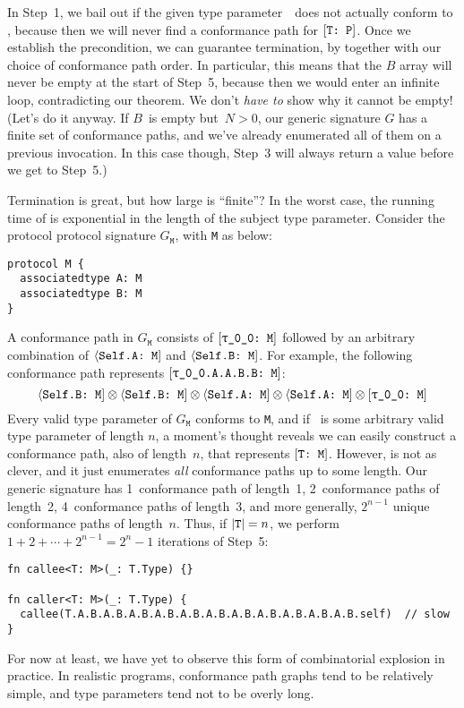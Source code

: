 \documentclass[../generics]{subfiles}
\begin{document}
In Step~1, we bail out if the given type parameter~\tT\ does not actually conform to \tP, because then we will never find a conformance path for $[\texttt{T:~P}]$. Once we establish the precondition, we can guarantee termination, by  together with our choice of conformance path order. In particular, this means that the $B$ array will never be empty at the start of Step~5, because then we would enter an infinite loop, contradicting our theorem. We don't \emph{have to} show why it cannot be empty! (Let's do it anyway. If $B$~is empty but~$N>0$, our generic signature $G$ has a finite set of conformance paths, and we've already enumerated all of them on a previous invocation. In this case though, Step~3 will always return a value before we get to Step~5.)

\begin{example}\label{free monoid first time}
Termination is great, but how large is ``finite''? In the worst case, the running time of  is exponential in the length of the subject type parameter. Consider the protocol protocol signature $G_\texttt{M}$, with \texttt{M} as below:
\begin{Verbatim}
protocol M {
  associatedtype A: M
  associatedtype B: M
}
\end{Verbatim}
A conformance path in $G_{\texttt{M}}$ consists of $\ConfReq{\rT}{M}$ followed by an arbitrary combination of $\langle\texttt{Self.A:~M}]$ and $\langle\texttt{Self.B:~M}]$. For example, the following conformance path represents $\ConfReq{\rT.A.A.B.B}{M}$:
\[
\AssocConf{Self.B}{M} \otimes \AssocConf{Self.B}{M} \otimes \AssocConf{Self.A}{M} \otimes \AssocConf{Self.A}{M} \otimes \ConfReq{\rT}{M}
\]
Every valid type parameter of $G_\texttt{M}$ conforms to \texttt{M}, and if \tT\ is some arbitrary valid type parameter of length $n$, a moment's thought reveals we can easily construct a conformance path, also of length~$n$, that represents $[\texttt{T:~M}]$. However,  is not as clever, and it just enumerates \emph{all} conformance paths up to some length. Our generic signature has 1~conformance path of length~1, 2~conformance paths of length~2, 4~conformance paths of length~3, and more generally, $2^{n-1}$ unique conformance paths of length~$n$. Thus, if $|\texttt{T}|=n$, we perform $1+2+\cdots+2^{n-1}=2^n-1$ iterations of Step~5:
\begin{Verbatim}
fn callee<T: M>(_: T.Type) {}

fn caller<T: M>(_: T.Type) {
  callee(T.A.B.A.B.A.B.A.B.A.B.A.B.A.B.A.B.A.B.A.B.A.B.self)  // slow
}
\end{Verbatim}
For now at least, we have yet to observe this form of combinatorial explosion in practice. In realistic programs, conformance path graphs tend to be relatively simple, and type parameters tend not to be overly long.
\end{example}
\end{document}
